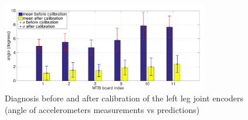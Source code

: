 \begin{figure}[hb!]
  \centering
    \includegraphics[width=0.8\textwidth]{images/T4.2-selfCalibration-Diagnosis.png}
    \caption{Diagnosis before and after calibration of the left leg joint encoders (angle of accelerometers measurements vs predictions)}
    \label{fig:T4.2-selfCalibration-Diagnosis}
\end{figure}

